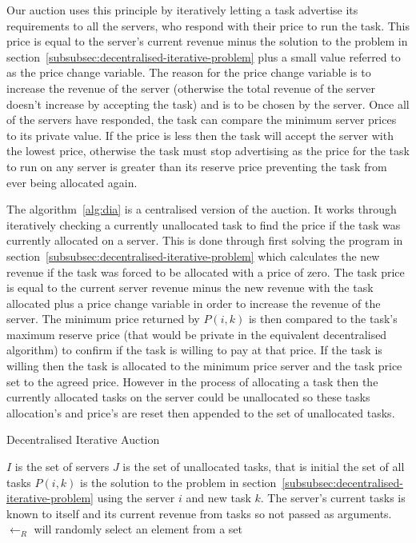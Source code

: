 Our auction uses this principle by iteratively letting a task advertise its requirements to all the servers, who
respond with their price to run the task. This price is equal to the server's current revenue minus the solution to the
problem in section~\ref{subsubsec:decentralised-iterative-problem} plus a small value referred to as the price change
variable. The reason for the price change variable is to increase the revenue of the server (otherwise the total
revenue of the server doesn't increase by accepting the task) and is to be chosen by the server. Once all of the servers
have responded, the task can compare the minimum server prices to its private value. If the price is less then the
task will accept the server with the lowest price, otherwise the task must stop advertising as the price for the task
to run on any server is greater than its reserve price preventing the task from ever being allocated again.

The algorithm~\ref{alg:dia} is a centralised version of the auction. It works through iteratively checking a currently
unallocated task to find the price if the task was currently allocated on a server. This is done through first solving
the program in section~\ref{subsubsec:decentralised-iterative-problem} which calculates the new revenue if the task was
forced to be allocated with a price of zero. The task price is equal to the current server revenue minus the new
revenue with the task allocated plus a price change variable in order to increase the revenue of the server. The
minimum price returned by $P(i, k)$ is then compared to the task's maximum reserve price (that would be private in the
equivalent decentralised algorithm) to confirm if the task is willing to pay at that price. If the task is willing then
the task is allocated to the minimum price server and the task price set to the agreed price. However in the process of
allocating a task then the currently allocated tasks on the server could be unallocated so these tasks allocation's and
price's are reset then appended to the set of unallocated tasks.

\begin{algorithm}
    \caption{Decentralised Iterative Auction}
    \label{alg:dia}
    \begin{algorithmic}
        \REQUIRE $I$ is the set of servers
        \REQUIRE $J$ is the set of unallocated tasks, that is initial the set of all tasks
        \REQUIRE $P(i, k)$ is the solution to the problem in section~\ref{subsubsec:decentralised-iterative-problem}
            using the server $i$ and new task $k$. The server's current tasks is known to itself and its current
            revenue from tasks so not passed as arguments.
        \REQUIRE $\leftarrow_R$ will randomly select an element from a set

            \ENDIF
        \ENDWHILE
    \end{algorithmic}
\end{algorithm}

